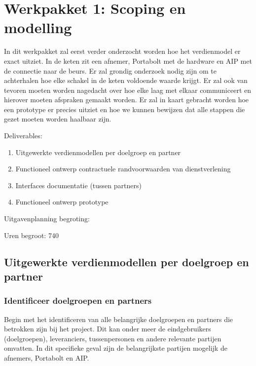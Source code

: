 \section{Werkpakket 1:  Scoping en modelling}
In dit werkpakket zal eerst verder onderzocht worden hoe het verdienmodel er exact uitziet. In de keten zit een afnemer, Portabolt met de hardware en AIP met de connectie naar de beurs. Er zal grondig onderzoek nodig zijn om te achterhalen hoe elke schakel in de keten voldoende waarde krijgt. Er zal ook van tevoren moeten worden nagedacht over hoe elke laag met elkaar communiceert en hierover moeten afspraken gemaakt worden. Er zal in kaart gebracht worden hoe een prototype er precies uitziet en hoe we kunnen bewijzen dat alle stappen die gezet moeten worden haalbaar zijn. 

Deliverables: 
\begin{enumerate}
	\item Uitgewerkte verdienmodellen per doelgroep en partner
	\item Functioneel ontwerp contractuele randvoorwaarden van dienstverlening 
	\item Interfaces documentatie (tussen partners) 
	\item Functioneel ontwerp prototype 
\end{enumerate}

Uitgavenplanning begroting: 

Uren begroot: 740



\subsection{Uitgewerkte verdienmodellen per doelgroep en partner}

\subsubsection{Identificeer doelgroepen en partners}
Begin met het identificeren van alle belangrijke doelgroepen en partners die betrokken zijn bij het project. Dit kan onder meer de eindgebruikers (doelgroepen), leveranciers, tussenpersonen en andere relevante partijen omvatten. In dit specifieke geval zijn de belangrijkste partijen mogelijk de afnemers, Portabolt en AIP.

